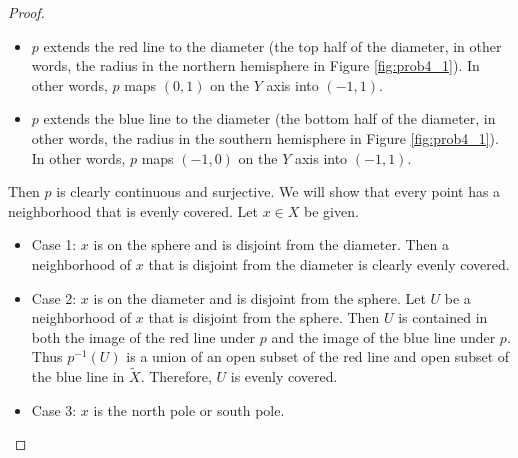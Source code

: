 \documentclass[12pt, psamsfonts]{amsart}
\theoremstyle{definition}
\theoremstyle{remark}
\numberwithin{equation}{section}
\begin{document}
\begin{proof}
\begin{itemize}
\begin{itemize}
        \item
          $p$ extends the red line to the diameter (the top half of the diameter, in other words, the radius in the northern hemisphere in Figure \ref{fig:prob4_1}).
          In other words, $p$ maps $(0, 1)$ on the $Y$ axis into $(-1, 1)$.
        \item
          $p$ extends the blue line to the diameter (the bottom half of the diameter, in other words, the radius in the southern hemisphere in Figure \ref{fig:prob4_1}).
          In other words, $p$ maps $(-1, 0)$ on the $Y$ axis into $(-1, 1)$.
      \end{itemize}
      Then $p$ is clearly continuous and surjective.
      We will show that every point has a neighborhood that is evenly covered.
      Let $x \in X$ be given.
      \begin{itemize}
        \item
          Case 1: $x$ is on the sphere and is disjoint from the diameter.
          Then a neighborhood of $x$ that is disjoint from the diameter is clearly evenly covered.
        \item
          Case 2: $x$ is on the diameter and is disjoint from the sphere.
          Let $U$ be a neighborhood of $x$ that is disjoint from the sphere.
          Then $U$ is contained in both the image of the red line under $p$ and the image of the blue line under $p$.
          Thus $p^{-1}(U)$ is a union of an open subset of the red line and open subset of the blue line in $\tilde{X}$.
          Therefore, $U$ is evenly covered.
        \item
          Case 3: $x$ is the north pole or south pole.
      \end{itemize}
  \end{itemize}
\end{proof}
\end{document}
